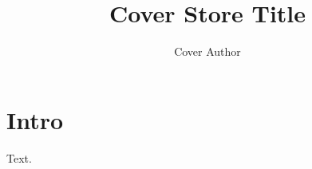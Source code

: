 \documentclass{article}
\title{Cover Store Title}
\author{Cover Author}
\begin{document}
\begin{titlepage}
\begin{center}
{\huge\bfseries \@title\par}
\bigskip
{\Large \@author\par}
\end{center}
\end{titlepage}
\section{Intro}
Text.
\end{document}
